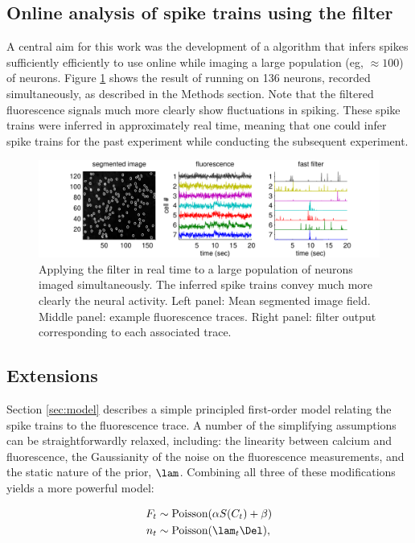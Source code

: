 \subsection{Online analysis of spike trains using the \foopsi filter}

A central aim for this work was the development of a algorithm that infers spikes sufficiently efficiently to use online while imaging a large population (eg, $\approx 100$) of neurons.  Figure \ref{fig:pop} shows the result of running \foopsi on 136 neurons, recorded simultaneously, as described in the Methods section.  Note that the filtered fluorescence signals much more clearly show fluctuations in spiking. These spike trains were inferred in approximately real time, meaning that one could infer spike trains for the past experiment while conducting the subsequent experiment.


\begin{figure}[h!]
\centering \includegraphics[width=.9\linewidth]{../figs/pop}
\caption{Applying the \foopsi filter in real time to a large population of neurons imaged simultaneously.  The inferred spike trains convey much more clearly the neural activity.  Left panel: Mean segmented image field.  Middle panel: example fluorescence traces.  Right panel: \foopsi filter output corresponding to each associated trace.} \label{fig:pop}
\end{figure}


\subsection{Extensions}

Section \ref{sec:model} describes a simple principled first-order model relating the spike trains to the fluorescence trace. A number of the simplifying assumptions can be straightforwardly relaxed, including: the linearity between calcium and fluorescence, the Gaussianity of the noise on the fluorescence measurements, and the static nature of the prior, $\lam$.  Combining all three of these modifications yields a more powerful model:


\begin{align}
	F_t &\sim \text{Poisson}(\alpha S(C_t) + \beta) \label{eq:nonlin} \\
	n_t &\sim \text{Poisson}(\lam_t \Del),
\end{align}

